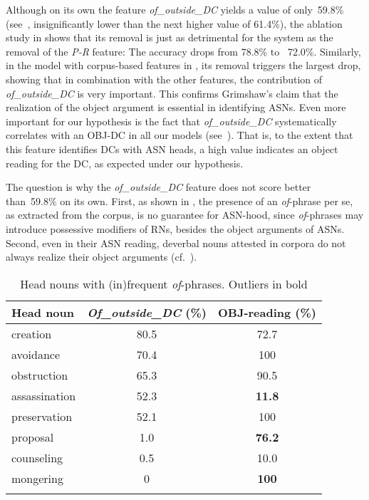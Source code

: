 \documentclass[output=paper]{langsci/langscibook}
\begin{document}
Although on its own the feature \textit{of\_outside\_DC} yields a value of only~59.8\% (see~, insignificantly lower than the  {next higher value of} 61.4\%), the ablation study in  shows that its removal is just as detrimental for the system as the removal of the \textit{P-R} feature: The accuracy drops from 78.8\% to~ {72.0}\%. Similarly, in the model with corpus-based features in , its removal triggers the largest drop, showing that in combination with the other features, the contribution of \textit{of\_outside\_DC} is very important. This confirms Grimshaw's claim that the realization of the object argument is essential in identifying ASNs. Even more important for our hypothesis is the fact that \textit{\textit{of}\_outside\_DC} systematically correlates with an OBJ-DC in all our models (see~). That is, to the extent that this feature identifies DCs with ASN heads, a high value indicates an object reading for the DC, as expected under our hypothesis.


The question is why the \textit{of\_outside\_DC} feature  does not score better than~59.8\% on its own.  {First, as shown in , the presence of an \textit{of}-phrase per se, as extracted from the corpus, is no guarantee for ASN-hood, since \textit{of}-phrases may introduce possessive modifiers of RNs, besides the object arguments of ASNs. Second,} even in their ASN reading, deverbal nouns attested in corpora do not always realize their object arguments (cf.~\citealt{grimm:mcnally:13}). 

  
\begin{table}
\caption{\label{tab:ex:of:phrases}Head nouns with (in)frequent \textit{of}-phrases. Outliers in bold}
\begin{tabular}{lSS}
\lsptoprule
{Head noun}& {\textit{Of\_outside\_DC} (\%)}& {OBJ-reading (\%)}\\
\midrule
creation&80.5&72.7\\ 
avoidance&70.4&100\\
obstruction&65.3&90.5\\   
assassination&52.3&\bfseries 11.8\\ 
preservation&52.1&100\\   
proposal&1.0&\bfseries 76.2\\ 
counseling&0.5&10.0\\
mongering&0& \bfseries 100\\
\lspbottomrule
\end{tabular}
\end{table}
\end{document}
